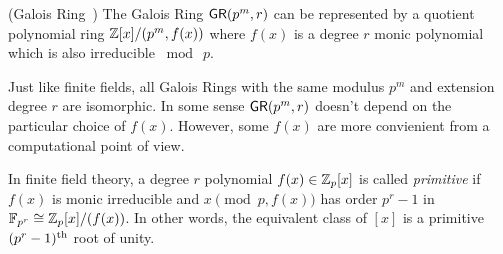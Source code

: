 \begin{definition}{(Galois Ring~\cite{MISC:WikiGalRing})} \label{def:GaloisRing}
    The Galois Ring \(\mathsf{GR}(p^m, r)\) can be represented by a quotient polynomial ring \(\mathbb{Z}[x] / (p^m, f(x))\) where \(f(x)\) is a degree \(r\) monic polynomial which is also irreducible \(\bmod \  p\).
\end{definition}

Just like finite fields, all Galois Rings with the same modulus \(p^m\) and extension degree \(r\) are isomorphic. In some sense \(\mathsf{GR}(p^m, r)\) doesn't depend on the particular choice of \(f(x)\). However, some \(f(x)\) are more convienient from a computational point of view.

In finite field theory, a degree \(r\) polynomial \(f(x) \in \mathbb{Z}_p[x]\) is called \emph{primitive} if \(f(x)\) is monic irreducible and \(x \pmod{p, f(x)}\) has order \(p^r - 1\) in \(\mathbb{F}_{p^r} \cong \mathbb{Z}_p[x]/(f(x))\). In other words, the equivalent class of \([x]\) is a primitive \((p^r - 1)\textsuperscript{th}\) root of unity.

